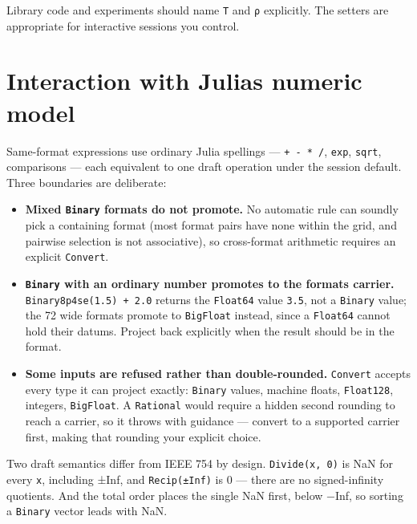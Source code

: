 Library code and experiments should name \texttt{T} and \texttt{ρ} explicitly. The setters are appropriate for interactive sessions you control.



\section{Interaction with Julia{\textquotesingle}s numeric model}



\label{12536725406993873247}{}


Same-format expressions use ordinary Julia spellings — \texttt{+ - * /}, \texttt{exp}, \texttt{sqrt}, comparisons — each equivalent to one draft operation under the session default. Three boundaries are deliberate:



\begin{itemize}
\item \textbf{Mixed \texttt{Binary} formats do not promote.} No automatic rule can soundly pick a containing format (most format pairs have none within the grid, and pairwise selection is not associative), so cross-format arithmetic requires an explicit \texttt{Convert}.


\item \textbf{\texttt{Binary} with an ordinary number promotes to the format{\textquotesingle}s carrier.} \texttt{Binary8p4se(1.5) + 2.0} returns the \texttt{Float64} value \texttt{3.5}, not a \texttt{Binary} value; the 72 wide formats promote to \texttt{BigFloat} instead, since a \texttt{Float64} cannot hold their datums. Project back explicitly when the result should be in the format.


\item \textbf{Some inputs are refused rather than double-rounded.} \texttt{Convert} accepts every type it can project exactly: \texttt{Binary} values, machine floats, \texttt{Float128}, integers, \texttt{BigFloat}. A \texttt{Rational} would require a hidden second rounding to reach a carrier, so it throws with guidance — convert to a supported carrier first, making that rounding your explicit choice.

\end{itemize}


Two draft semantics differ from IEEE 754 by design. \texttt{Divide(x, 0)} is NaN for every \texttt{x}, including ±Inf, and \texttt{Recip(±Inf)} is 0 — there are no signed-infinity quotients. And the total order places the single NaN first, below −Inf, so sorting a \texttt{Binary} vector leads with NaN.




